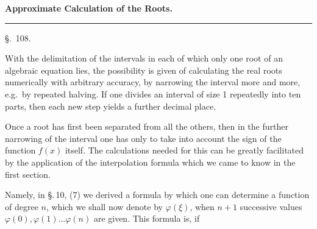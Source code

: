 
\begin{center}

\textbf{Approximate Calculation of the Roots.}

\rule{3cm}{0.4pt}

\S.\ 108.

\end{center}

With the delimitation of the intervals in each of which only one root of an algebraic equation lies, the possibility is given of calculating the real roots numerically with arbitrary accuracy, by narrowing the interval more and more, e.g.\ by repeated halving. If one divides an interval of size 1 repeatedly into ten parts, then each new step yields a further decimal place.

Once a root has first been separated from all the others, then in the further narrowing of the interval one has only to take into account the sign of the function $f(x)$ itself. The calculations needed for this can be greatly facilitated by the application of the interpolation formula which we came to know in the first section.

Namely, in \S.\,10, (7) we derived a formula by which one can determine a function of degree $n$, which we shall now denote by $\varphi(\xi)$, when $n+1$ successive values $\varphi(0), \varphi(1) \ldots \varphi(n)$ are given. This formula is, if
